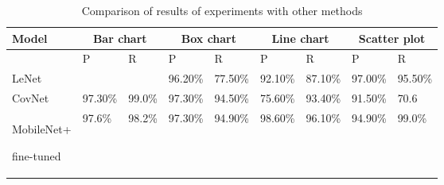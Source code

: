 \documentclass[12pt, a4paper,oneside]{report}
\begin{document}
\begin{table}[!htbp]
	\centering {} \small
	\begin{adjustbox}{max width=1.0\textwidth,center}
		
\begin{tabular}{|p{3cm}|p{2cm}|p{2cm}|p{2cm}|p{2cm}|p{2cm}|p{2cm}|p{2cm}|p{2cm}|}
			\hline	
			
			Model & \multicolumn{2}{c|}{Bar chart} & \multicolumn{2}{|c|}{Box chart} & \multicolumn{2}{c|}{Line chart} & \multicolumn{2}{|c|}{Scatter plot}  \\ \hline
			
			 & P & R  & P & R & P & R & P & R  \\ \hline
			
			LeNet \cite{amara2017convolutional} &  &  & 96.20\% & 77.50\% & 92.10\% & 87.10\% & 97.00\% & 95.50\%  \\ \hline
				
			CovNet &  97.30\% &  99.0\% & 97.30\% & 94.50\% & 75.60\% & 93.40\% & 91.50\% & 70.6  \\ \hline
			
			
			MobileNet+\par fine-tuned &  97.6\% &  98.2\% & 97.30\% & 94.90\% & 98.60\% & 96.10\% & 94.90\% & 99.0\%  \\ \hline
				
					
		\end{tabular}	
	\end{adjustbox}
	\caption {Comparison of results of experiments with other  methods}	
	\label{table:parar}
\end{table}
\end{document}
